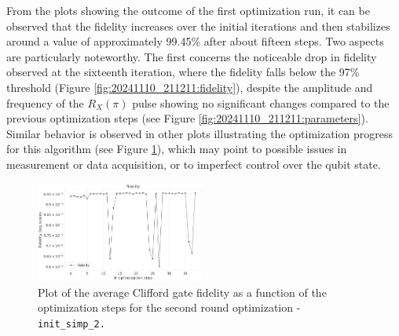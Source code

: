 From the plots showing the outcome of the first optimization run, it can be observed that the fidelity increases over the initial iterations and then stabilizes around a value of approximately 99.45\% after about fifteen steps.
Two aspects are particularly noteworthy. The first concerns the noticeable drop in fidelity observed at the sixteenth iteration, where the fidelity falls below the 97\% threshold (Figure \ref{fig:20241110_211211:fidelity}), despite the amplitude and frequency of the $R_X(\pi)$ pulse showing no significant changes compared to the previous optimization steps (see Figure \ref{fig:20241110_211211:parameters}).
Similar behavior is observed in other plots illustrating the optimization progress for this algorithm (see Figure \ref{fig:20241113_181711:fidelity}), which may point to possible issues in measurement or data acquisition, or to imperfect control over the qubit state.

\begin{figure}[h!]
    \centering
    \includegraphics[width=0.495\textwidth]{figures/png/RB_optimization/NM/InitialSymplex/20241113_181711/fidelity.png}
    \caption{Plot of the average Clifford gate fidelity as a function of the optimization steps for the second round optimization - \tt{init\_simp\_2}.}
    \label{fig:20241113_181711:fidelity}
\end{figure}

